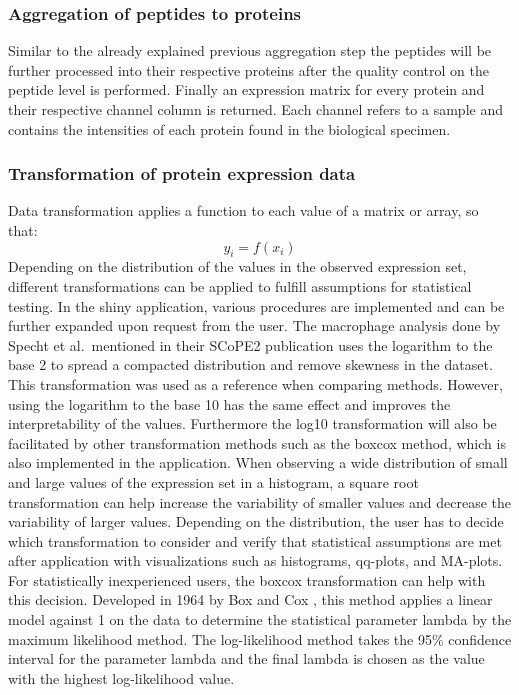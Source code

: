 \documentclass[
  11pt,
]{article}
\begin{document}
\hypertarget{aggregation-of-peptides-to-proteins}{%
\subsubsection{Aggregation of peptides to proteins}\label{aggregation-of-peptides-to-proteins}}

Similar to the already explained previous aggregation step the peptides will be further processed into their respective proteins after the quality control on the peptide level is performed. Finally an expression matrix for every protein and their respective channel column is returned. Each channel refers to a sample and contains the intensities of each protein found in the biological specimen.

\hypertarget{transformation-of-protein-expression-data}{%
\subsubsection{Transformation of protein expression data}\label{transformation-of-protein-expression-data}}

Data transformation applies a function to each value of a matrix or array, so that:
\[
y_i = f(x_i)
\]
Depending on the distribution of the values in the observed expression set, different transformations can be applied to fulfill assumptions for statistical testing. In the shiny application, various procedures are implemented and can be further expanded upon request from the user. The macrophage analysis done by Specht et al.~mentioned in their SCoPE2 publication \citep{Specht2021} uses the logarithm to the base 2 to spread a compacted distribution and remove skewness in the dataset. This transformation was used as a reference when comparing methods. However, using the logarithm to the base 10 has the same effect and improves the interpretability of the values. Furthermore the log10 transformation will also be facilitated by other transformation methods such as the boxcox method, which is also implemented in the application.
When observing a wide distribution of small and large values of the expression set in a histogram, a square root transformation can help increase the variability of smaller values and decrease the variability of larger values.
Depending on the distribution, the user has to decide which transformation to consider and verify that statistical assumptions are met after application with visualizations such as histograms, qq-plots, and MA-plots.
For statistically inexperienced users, the boxcox transformation can help with this decision. Developed in 1964 by Box and Cox \citep{Sakia1992}, this method applies a linear model against 1 on the data to determine the statistical parameter lambda by the maximum likelihood method. The log-likelihood method takes the 95\% confidence interval for the parameter lambda and the final lambda is chosen as the value with the highest log-likelihood value.
\end{document}
